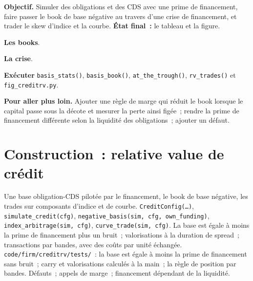 \begin{tutorial}
\textbf{Objectif.} Simuler des obligations et des CDS avec une prime de financement, faire passer le book de base négative au travers d'une crise de financement, et trader le skew d'indice et la
courbe. \textbf{État final~:} le tableau et la figure.
\begin{tutsteps}
\item \textbf{Les books}.
\label{lst:s2:credit-relative-value:book}
\item \textbf{La crise}.
\label{lst:s2:credit-relative-value:crisis}
\item \textbf{Exécuter} \texttt{basis\_stats()}, \texttt{basis\_book()}, \texttt{at\_the\_trough()}, \texttt{rv\_trades()} et \texttt{fig\_creditrv.py}.
\end{tutsteps}
\textbf{Pour aller plus loin.} Ajouter une règle de marge qui réduit le book lorsque le capital passe sous la décote et mesurer la perte ainsi figée~; rendre la
prime de financement différente selon la liquidité des obligations~; ajouter un défaut.
\end{tutorial}

\section{Construction~: relative value de crédit}\label{bld:s2:credit-relative-value:creditrv}

\begin{build}
 Une base obligation-CDS pilotée par le financement, le book de base négative, les trades sur composants d'indice et de courbe.
 \texttt{CreditConfig(\dots)}, \texttt{simulate\_credit(cfg)}, \texttt{negative\_basis(sim, cfg, own\_funding)},
\texttt{index\_arbitrage(sim, cfg)}, \texttt{curve\_trade(sim, cfg)}.
 La base est égale à moins la prime de financement plus un bruit~; valorisations à la duration de spread~; transactions par bandes, avec des coûts par unité échangée.
 \texttt{code/firm/creditrv/tests/}~: la base est égale à moins la prime de financement sans bruit~; carry et valorisations calculés à la main~; la
règle de position par bandes.
 Défauts~; appels de marge~; financement dépendant de la liquidité.
\end{build}

